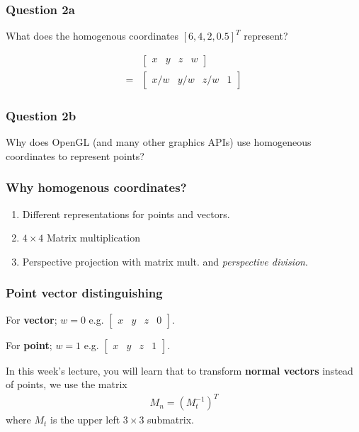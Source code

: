 \documentclass{beamer}
\begin{document}
\begin{frame}
    \frametitle{Question 2a}

    What does the homogenous coordinates $[6, 4, 2, 0.5]^T$ represent?

    \begin{tcolorbox}
        \begin{eqnarray*}
            & \left[
            \begin{matrix}
                x & y & z & w
            \end{matrix} 
            \right]\\
            = & \left[
            \begin{matrix}
                x/w & y/w & z/w & 1
            \end{matrix}
            \right]
        \end{eqnarray*}
    \end{tcolorbox}
    

\end{frame}

\begin{frame}
    \frametitle{Question 2b}

    Why does OpenGL (and many other graphics APIs) use homogeneous coordinates to represent points?

\end{frame}

\begin{frame}
    \frametitle{Why homogenous coordinates?}

    \begin{enumerate}
        \item Different representations for points and vectors.
        \item $4 \times 4$ Matrix multiplication
        \item Perspective projection with matrix mult. and \textit{perspective division}.
    \end{enumerate}
    
\end{frame}

\begin{frame}
    \frametitle{Point vector distinguishing}

    For \textbf{vector}; $w = 0$ \quad e.g. $\left[ \begin{matrix}
        x & y & z & 0
    \end{matrix} \right]$.

    For \textbf{point}; $w = 1$ \quad e.g. $\left[ \begin{matrix}
        x & y & z & 1
    \end{matrix} \right]$.

    \begin{tcolorbox}
        In this week's lecture, you will learn that to transform \textbf{normal vectors} instead of points,
        we use the matrix
        \begin{eqnarray*}
            M_n = (M_t^{-1})^T
        \end{eqnarray*}
        where $M_t$ is the upper left $3 \times 3$ submatrix.
    \end{tcolorbox}

\end{frame}
\end{document}
